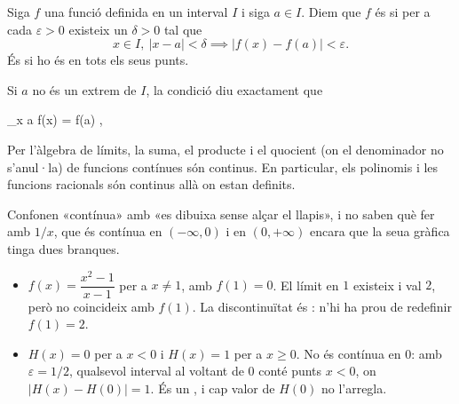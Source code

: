 
\begin{frame}

\begin{definition}[Continuïtat]
Siga $f$ una funció definida en un interval $I$ i siga $a \in I$. Diem que
$f$ és  si per a cada $\varepsilon > 0$ existeix un
$\delta > 0$ tal que
\[
  x \in I, \ |x - a| < \delta \implies |f(x) - f(a)| < \varepsilon .
\]
És  si ho és en tots els seus punts.
\end{definition}

Si $a$ no és un extrem de $I$, la condició diu exactament que
\begin{keyformula}
  \lim_{x \to a} f(x) = f(a) ,
\end{keyformula}
\end{frame}

\begin{frame}

\begin{remark}
Per l'àlgebra de límits, la suma, el producte i el quocient (on el
denominador no s'anul·la) de funcions contínues són continus. En particular,
els polinomis i les funcions racionals són continus allà on estan definits.
\end{remark}

\begin{commonmistake}
Confonen «contínua» amb «es dibuixa sense alçar el llapis», i no saben què
fer amb $1/x$, que és contínua en $(-\infty, 0)$ i en $(0, +\infty)$ encara
que la seua gràfica tinga dues branques.
\end{commonmistake}
\end{frame}

\begin{frame}

\begin{example}
\begin{itemize}
  \item $f(x) = \dfrac{x^2 - 1}{x - 1}$ per a $x \neq 1$, amb $f(1) = 0$. El
        límit en $1$ existeix i val $2$, però no coincideix amb $f(1)$. La
        discontinuïtat és : n'hi ha prou de redefinir
        $f(1) = 2$.
  \item $H(x) = 0$ per a $x < 0$ i $H(x) = 1$ per a $x \geq 0$. No és
        contínua en $0$: amb $\varepsilon = 1/2$, qualsevol interval al
        voltant de $0$ conté punts $x < 0$, on $|H(x) - H(0)| = 1$. És un
        , i cap valor de $H(0)$ no l'arregla.
\end{itemize}
\end{example}
\end{frame}
